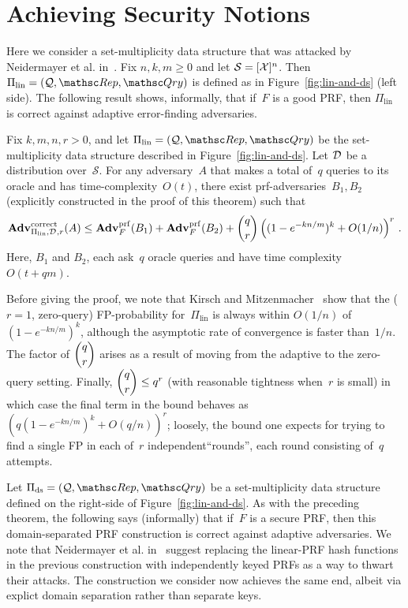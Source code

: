 \section{Achieving Security Notions}



Here we consider a set-multiplicity data structure that was attacked by Neidermayer et al. in~\cite{xxx}. Fix $n,k,m \geq 0$ and let $\mathcal{S}=[{\cal X}]^n$.  Then $\Pi_{\mathrm{lin}}= (\calQ,\Rep, \Qry)$ is defined as in Figure~\ref{fig:lin-and-ds} (left side).  The following result shows, informally, that if~$F$ is a good PRF, then $\Pi_\mathrm{lin}$ is correct against adaptive error-finding adversaries. 

\begin{theorem}\label{thm1}
Fix $k,m,n,r>0$, and let $\Pi_{\mathrm{lin}}= (\calQ,\Rep, \Qry)$ be the set-multiplicity data structure described in Figure~\ref{fig:lin-and-ds}. Let $\mathcal{D}_{}^{}$ be a distribution over~$\mathcal{S}$.  For any adversary~$A$ that makes a total of~$q$ queries to its oracle and has time-complexity~$O(t)$, there exist prf-adversaries~$B_1,B_2$ (explicitly constructed in the proof of this theorem) such that
\[
\mathrm{\mathbf{Adv}}^{\mathrm{correct}}_{\Pi_{\mathrm{lin}},\mathcal{D}_{}^{},r}(A) \leq  \mathbf{Adv}^{\mathrm{prf}}_{F}(B_1) + \mathbf{Adv}^{\mathrm{prf}}_{F}(B_2)  +{\dbinom{q}{r}} \left( (1-e^{-kn/m})^k + O(1/n) \right)^r\,.
\]
Here, $B_1$ and $B_2$, each ask~$q$ oracle queries and have time complexity~$O(t+qm)$.
\end{theorem}
Before giving the proof, we note that Kirsch and Mitzenmacher~\cite{xxx} show
that the ($r=1$, zero-query) FP-probability for~$\Pi_\mathrm{lin}$ is
always within $O(1/n)$ of $(1-e^{-kn/m})^k$, although the asymptotic
rate of convergence is faster than~$1/n$.  The factor of $\dbinom{q}{r}$ arises as a result
of moving from the adaptive to the zero-query setting.  Finally, $\dbinom{q}{r} \leq q^r$ (with
reasonable tightness when~$r$ is small) in which case the final term in the bound behaves as
$(q (1-e^{-kn/m})^k + O(q/n) )^r$; loosely, the bound one expects for
trying to find a single FP in each of~$r$ independent``rounds'', each round
consisting of~$q$ attempts.

Let $\Pi_{\mathrm{ds}}= (\calQ,\Rep, \Qry)$ be a set-multiplicity data structure defined on the right-side of Figure~\ref{fig:lin-and-ds}.  As with the preceding theorem, the following says (informally) that if~$F$ is a secure PRF, then this domain-separated PRF construction is correct against adaptive adversaries.  We note that Neidermayer et al. in~\cite{xxx} suggest replacing the linear-PRF hash functions in the previous construction with independently keyed PRFs as a way to thwart their attacks.  The construction we consider now achieves the same end, albeit via explict domain separation rather than separate keys.


